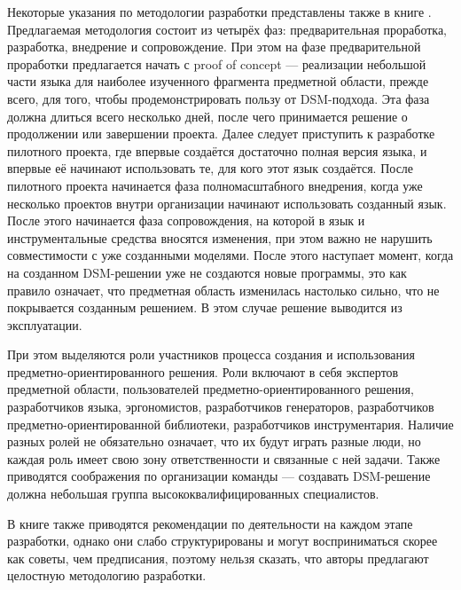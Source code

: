 Некоторые указания по методологии разработки представлены также в книге \cite{kelly2008domain}. 
Предлагаемая методология состоит из четырёх фаз: предварительная проработка, разработка, 
внедрение и сопровождение. При этом на фазе предварительной проработки предлагается начать с
proof of concept --- реализации небольшой части языка для наиболее изученного фрагмента 
предметной области, прежде всего, для того, чтобы продемонстрировать пользу от DSM-подхода. 
Эта фаза должна длиться всего несколько дней, после чего принимается решение о продолжении 
или завершении проекта. Далее следует приступить к разработке пилотного проекта, где 
впервые создаётся достаточно полная версия языка, и впервые её начинают использовать 
те, для кого этот язык создаётся. После пилотного проекта начинается фаза полномасштабного 
внедрения, когда уже несколько проектов внутри организации начинают использовать созданный 
язык. После этого начинается фаза сопровождения, на которой в язык и инструментальные 
средства вносятся изменения, при этом важно не нарушить совместимости с уже созданными 
моделями. После этого наступает момент, когда на созданном DSM-решении уже не создаются 
новые программы, это как правило означает, что предметная область изменилась настолько 
сильно, что не покрывается созданным решением. В этом случае решение выводится из эксплуатации.

При этом выделяются роли участников процесса создания и использования предметно-ориентированного 
решения. Роли включают в себя экспертов предметной области, пользователей предметно-ориентированного 
решения, разработчиков языка, эргономистов, разработчиков генераторов, разработчиков 
предметно-ориентированной библиотеки, разработчиков инструментария. Наличие разных 
ролей не обязательно означает, что их будут играть разные люди, но каждая роль имеет свою зону 
ответственности и связанные с ней задачи. Также приводятся соображения по организации команды 
--- создавать DSM-решение должна небольшая группа высококвалифицированных специалистов.

В книге также приводятся рекомендации по деятельности на каждом этапе разработки, однако 
они слабо структурированы и могут восприниматься скорее как советы, чем предписания, 
поэтому нельзя сказать, что авторы предлагают целостную методологию разработки.

